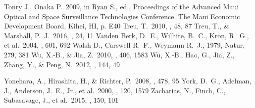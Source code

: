 \documentclass[manuscript]{aastex}
\begin{document}
\begin{thebibliography}{}
 Tonry J., Onaka P.\ 2009, in Ryan S., ed., 
Proceedings of the Advanced Maui Optical and Space Surveillance Technologies Conference.
The Maui Economic Development Board, Kihei, HI, p. E40
 Treu, T.\ 2010, \araa, 48, 87
 Treu, T., \& Marshall, P.~J.\ 2016, \aapr, 24, 11 
 Vanden Berk, D.~E., Wilhite, B.~C., Kron, R.~G., et al.\ 2004, \apj, 601, 692 
 Walsh D., Carswell R.~F., Weymann R.~J., 1979, Natur, 279, 381 
 Wu, X.-B., \& Jia, Z.\ 2010, \mnras, 406, 1583 
 Wu, X.-B., Hao, G., Jia, Z., Zhang, Y., \& Peng, N.\ 2012, \aj, 144, 49 

 Yonehara, A., Hirashita, H., \& Richter, P.\ 2008, \aap, 478, 95
 York, D.~G., Adelman, J., Anderson, J.~E., Jr., et al.\ 2000, \aj, 120, 1579 
 Zacharias, N., Finch, C., Subasavage, J., et al.\ 2015, \aj, 150, 101 

\clearpage



\end{thebibliography}


\end{document}
